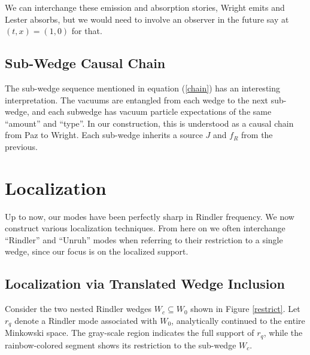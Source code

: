 \documentclass[12pt,a4paper]{article}
\begin{document}
{We can interchange these emission and absorption stories, Wright emits and Lester absorbs, but we would need to involve an observer in the future say at $(t,x) = (1,0)$ for that.  

\subsection{Sub-Wedge Causal Chain} \label{sec:chain_sources}

The sub-wedge sequence mentioned in equation (\ref{chain}) has an interesting interpretation.  The vacuums are entangled from each wedge to the next sub-wedge, and each subwedge has vacuum particle expectations of the same ``amount'' and ``type''. In our construction, this is understood as a causal chain from Paz to Wright.  Each sub-wedge inherits a source $J$ and $f_R$ from the previous. 

\section{Localization} \label{sec:loc}

Up to now, our modes have been perfectly sharp in Rindler frequency. We now construct various localization techniques. From here on we often interchange ``Rindler'' and ``Unruh'' modes when referring to their restriction to a single wedge, since our focus is on the localized support.

\subsection{Localization via Translated Wedge Inclusion}

Consider the two nested Rindler wedges $W_c \subseteq W_0$ shown in Figure \ref{restrict}. Let $r_q$ denote a Rindler mode associated with $W_0$, analytically continued to the entire Minkowski space. The gray-scale region indicates the full support of $r_q$, while the rainbow-colored segment shows its restriction to the sub-wedge $W_c$.

}
\end{document}
